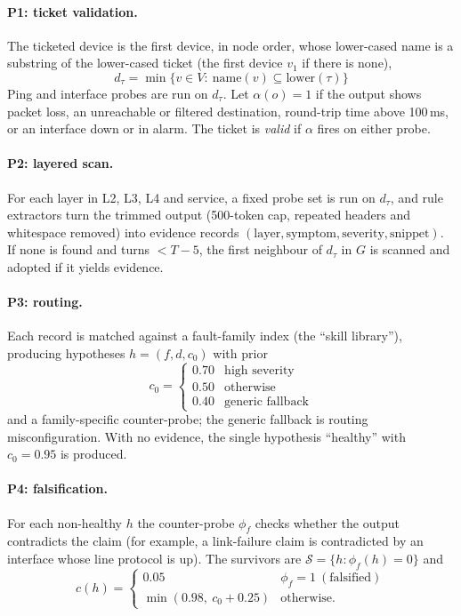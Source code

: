 \documentclass[pdflatex,sn-basic,Numbered,iicol]{sn-jnl}
\begin{document}
\paragraph{P1: ticket validation.} The ticketed device is the first device, in node order, whose lower-cased name is a substring of the lower-cased ticket (the first device $v_1$ if there is none),
\begin{equation}
d_\tau=\min\{v\in V:\ \mathrm{name}(v)\subseteq\mathrm{lower}(\tau)\}
\label{eq:ticketdev}
\end{equation}
Ping and interface probes are run on $d_\tau$. Let $\alpha(o)=1$ if the output shows packet loss, an unreachable or filtered destination, round-trip time above 100\,ms, or an interface down or in alarm. The ticket is \emph{valid} if $\alpha$ fires on either probe.

\paragraph{P2: layered scan.} For each layer in L2, L3, L4 and service, a fixed probe set is run on $d_\tau$, and rule extractors turn the trimmed output (500-token cap, repeated headers and whitespace removed) into evidence records $(\text{layer},\text{symptom},\text{severity},\text{snippet})$. If none is found and turns $<T-5$, the first neighbour of $d_\tau$ in $G$ is scanned and adopted if it yields evidence.

\paragraph{P3: routing.} Each record is matched against a fault-family index (the ``skill library''), producing hypotheses $h=(f,d,c_0)$ with prior
\begin{equation}
c_0=\begin{cases}0.70&\text{high severity}\\ 0.50&\text{otherwise}\\ 0.40&\text{generic fallback}\end{cases}
\label{eq:prior}
\end{equation}
and a family-specific counter-probe; the generic fallback is routing misconfiguration. With no evidence, the single hypothesis ``healthy'' with $c_0=0.95$ is produced.

\paragraph{P4: falsification.} For each non-healthy $h$ the counter-probe $\phi_f$ checks whether the output contradicts the claim (for example, a link-failure claim is contradicted by an interface whose line protocol is up). The survivors are $\mathcal{S}=\{h:\phi_f(h)=0\}$ and
\begin{equation}
c(h)=\begin{cases}0.05&\phi_f=1\ (\text{falsified})\\ \min(0.98,\ c_0+0.25)&\text{otherwise.}\end{cases}
\label{eq:conf}
\end{equation}
\end{document}

